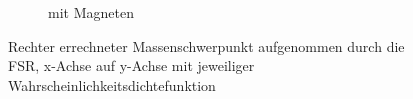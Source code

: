 \begin{landscape}
\begin{figure}[tb]
\begin{subfigure}[c]{.45\linewidth}
				\caption{mit Magneten}
			\end{subfigure}
		\caption{Rechter errechneter Massenschwerpunkt aufgenommen durch die FSR, x-Achse auf y-Achse mit jeweiliger Wahrscheinlichkeitsdichtefunktion} \label{CoM_rechts}
	\end{figure}
\end{landscape}